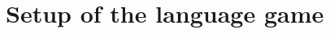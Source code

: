 \documentclass[11pt]{article}
\begin{document}
\section{Setup of the language game}
\label{sec:setup-language-game}
\centering
{}
\end{document}
